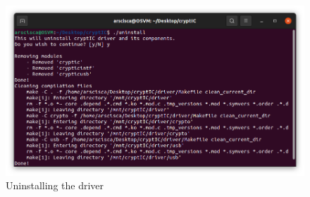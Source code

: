 \begin{figure}[htb]
		\center
		\includegraphics[width=\textwidth]{img/uninstall.png}
		\caption{Uninstalling the driver}
\end{figure}
